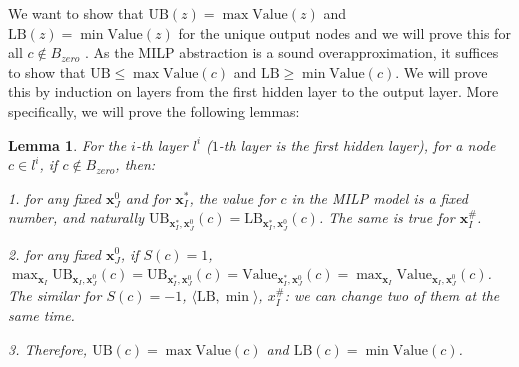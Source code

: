 \documentclass[]{article}
\newtheorem{lemma}{Lemma}
\theoremstyle{definition}
\newcommand{\Val}{\mathrm{Value}}
\newcommand{\UB}{\mathrm{UB}}
\newcommand{\LB}{\mathrm{LB}}
\begin{document}
We want to show that $\mathrm{UB}(z) = \max \Val (z)$ and $\mathrm{LB}(z) = \min \Val(z)$ for the unique output nodes and we will prove this for all $c\notin B_{zero}$ . As the MILP abstraction is a sound overapproximation, 
it suffices to show that $\mathrm{UB}\leq \max \Val(c)$ and $\mathrm{LB} \geq \min \Val(c)$. We will prove this by induction on layers from the first hidden layer to the output layer. More specifically, we will prove the following lemmas:


\begin{lemma}
	For the $i$-th layer $l^i$ ($1$-th layer is the first hidden layer), for a node $c\in l^i$, if $c\notin B_{zero}$, then:
	
	\vspace*{1ex}
	
	1. for any fixed $\boldsymbol{x}^0_J$ and for $\boldsymbol{x}^*_I$, the value for $c$ in the MILP model is a fixed number, and naturally $\UB_{\boldsymbol{x}^*_I,\boldsymbol{x}^0_J}(c)=\LB_{\boldsymbol{x}^*_I,\boldsymbol{x}^0_J}(c)$. The same is true for $\boldsymbol{x}^\#_I$.
	
	\vspace*{1ex}
	
	2. for any fixed $\boldsymbol{x}^0_J$, if $S(c)=1$,  $\max_{\boldsymbol{x}_I} \UB_{\boldsymbol{x}_I,\boldsymbol{x}^0_J}(c)=\UB_{\boldsymbol{x}^*_I,\boldsymbol{x}^0_J}(c)= \Val_{\boldsymbol{x}^*_I,\boldsymbol{x}^0_J}(c) = \max_{\boldsymbol{x}_I} \Val_{\boldsymbol{x}_I,\boldsymbol{x}^0_J}(c)$. The similar for $S(c)=-1$, $\langle \LB,\min\rangle$, $x^\#_I$: we can change two of them at the same time.
	
	\vspace*{1ex}
	
	3. Therefore, $\UB(c)=\max\Val(c)$ and $\LB(c)=\min\Val(c)$.
	
	
\end{lemma}
\end{document}
